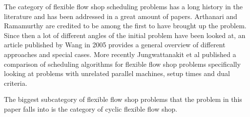 The category of flexible flow shop scheduling problems has a long history in the literature and has been addressed in a great amount of papers. Arthanari and Ramamurthy \cite{arth1971} are credited to be among the first to have brought up the problem. Since then a lot of different angles of the initial problem have been looked at, an article published by Wang \cite{wang2005} in 2005 provides a general overview of different approaches and special cases. More recently Jungwattanakit et al \cite{jung2009} published a comparison of scheduling algorithms for flexible flow shop problems specifically looking at problems with unrelated parallel machines, setup times and dual criteria.

The biggest subcategory of flexible flow shop problems that the problem in this paper falls into is the category of cyclic flexible flow shop.

\cite{blazewicz1111}
\cite{blazewicz1994}
\cite{kats1997a}
\cite{kats1997b}
\cite{wang2005}
\cite{blazewicz198}
\cite{levner1997}